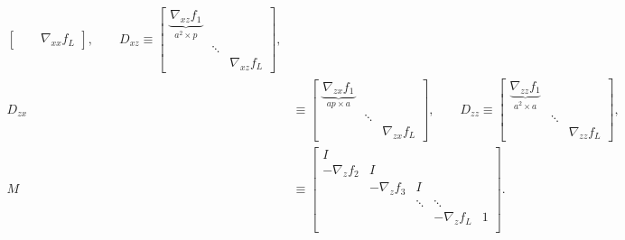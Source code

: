 \documentclass{article}
\begin{document}
\begin{align*}
\begin{bmatrix}
                                                                  &        & \nabla_{xx} f_L
                    \end{bmatrix}
    ,
    \qquad
    D_{xz} \equiv
    \begin{bmatrix}
        \underbrace{\nabla_{xz} f_1}_{a^2 \times p} &        &                 \\
                                                    & \ddots &                 \\
                                                    &        & \nabla_{xz} f_L
    \end{bmatrix}
    ,                                                                                                \\
    D_{zx} & \equiv \begin{bmatrix}
                        \underbrace{\nabla_{zx} f_1}_{ap \times a} &        &                 \\
                                                                   & \ddots &                 \\
                                                                   &        & \nabla_{zx} f_L
                    \end{bmatrix}
    ,
    \qquad
    D_{zz}  \equiv \begin{bmatrix}
                       \underbrace{\nabla_{zz} f_1}_{a^2\times a} &        &                 \\
                                                                  & \ddots &                 \\
                                                                  &        & \nabla_{zz} f_L
                   \end{bmatrix}
    ,                                                                                                \\
    M      & \equiv \begin{bmatrix}
                        I                                                          \\
                        -\nabla_z f_2 & I                                          \\
                                      & -\nabla_z f_3 & I                          \\
                                      &               & \ddots & \ddots            \\
                                      &               &        & -\nabla_z f_L & 1 \\
                    \end{bmatrix}
    .
\end{align*}
\end{document}
